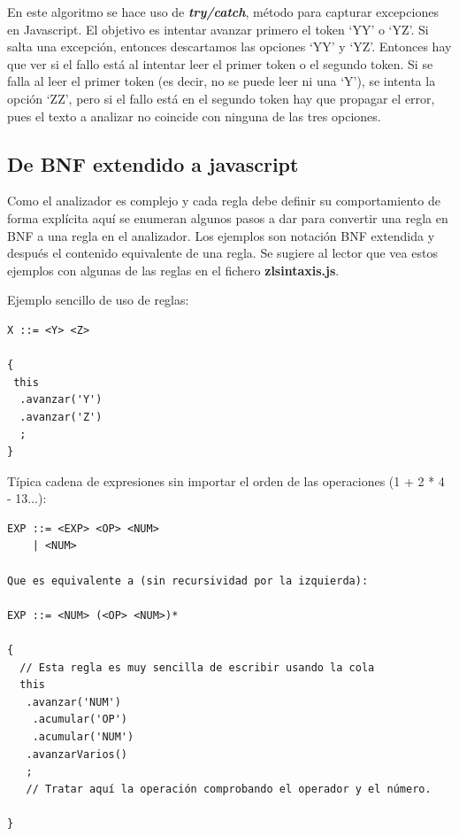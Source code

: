 \documentclass{report}
\begin{document}
	En este algoritmo se hace uso de \textbf{\textit{try/catch}}, método para capturar excepciones en Javascript. El objetivo es intentar avanzar primero el token `YY' o `YZ'. Si salta una excepción, entonces descartamos las opciones `YY' y `YZ'. Entonces hay que ver si el fallo está al intentar leer el primer token o el segundo token. Si se falla al leer el primer token (es decir, no se puede leer ni una `Y'), se intenta la opción `ZZ', pero si el fallo está en el segundo token hay que propagar el error, pues el texto a analizar no coincide con ninguna de las tres opciones. 


	\subsection{De BNF extendido a javascript}
	
	Como el analizador es complejo y cada regla debe definir su comportamiento de forma explícita aquí se enumeran algunos pasos a dar para convertir una regla en BNF a una regla en el analizador. Los ejemplos son notación BNF extendida y después el contenido equivalente de una regla. Se sugiere al lector que vea estos ejemplos con algunas de las reglas en el fichero \textbf{zlsintaxis.js}.
	
	\vspace{10px}
	
	Ejemplo sencillo de uso de reglas:
	
	\begin{BVerbatim}
X ::= <Y> <Z>

{
 this
  .avanzar('Y')
  .avanzar('Z')
  ;
}
	\end{BVerbatim}
	
	\vspace{10px}
	Típica cadena de expresiones sin importar el orden de las operaciones (1 + 2 * 4 - 13...):
	
	\begin{BVerbatim}
EXP ::= <EXP> <OP> <NUM>
    | <NUM>
    
Que es equivalente a (sin recursividad por la izquierda):

EXP ::= <NUM> (<OP> <NUM>)*    
 
{
  // Esta regla es muy sencilla de escribir usando la cola
  this
   .avanzar('NUM')
    .acumular('OP')
    .acumular('NUM')
   .avanzarVarios()
   ;
   // Tratar aquí la operación comprobando el operador y el número.
   
} 
	\end{BVerbatim}
	
\end{document}
